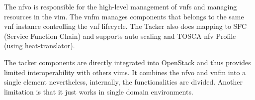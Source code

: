 The \gls{nfvo} is responsible for the high-level management of \glspl{vnf} and managing resources in the \gls{vim}. The \gls{vnfm} manages components that belongs to the same \gls{vnf} instance controlling the \gls{vnf} lifecycle. The Tacker also does mapping to SFC (Service Function Chain) and supports auto scaling and TOSCA \gls{nfv} Profile (using heat-translator).

The tacker components are directly integrated into OpenStack and thus provides limited interoperability with others \glspl{vim}. It combines the \gls{nfvo} and \gls{vnfm} into a single element nevertheless, internally, the functionalities are divided. Another limitation is that it just works in single domain environments.   





